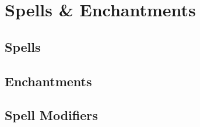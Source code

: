 \chapter{Spells \& Enchantments}

\section{Spells}

\section{Enchantments}

\section{Spell Modifiers}
